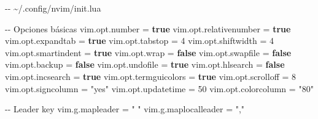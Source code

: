 \documentclass[
  doc,
  floatsintext,
  longtable,
  a4paper,
  nolmodern,
  notxfonts,
  notimes,
  12pt,
  colorlinks=true,linkcolor=blue,citecolor=blue,urlcolor=blue]{apa7}
\newenvironment{Shaded}{\begin{snugshade}}{\end{snugshade}}
\newcommand{\CommentTok}[1]{\textcolor[rgb]{0.37,0.37,0.37}{#1}}
\newcommand{\DecValTok}[1]{\textcolor[rgb]{0.68,0.00,0.00}{#1}}
\newcommand{\KeywordTok}[1]{\textcolor[rgb]{0.00,0.23,0.31}{\textbf{#1}}}
\newcommand{\OperatorTok}[1]{\textcolor[rgb]{0.37,0.37,0.37}{#1}}
\newcommand{\StringTok}[1]{\textcolor[rgb]{0.13,0.47,0.30}{#1}}
\newcommand{\VariableTok}[1]{\textcolor[rgb]{0.07,0.07,0.07}{#1}}
\begin{document}
\begin{Shaded}
\begin{Highlighting}[]
\CommentTok{{-}{-} \textasciitilde{}/.config/nvim/init.lua}

\CommentTok{{-}{-} Opciones básicas}
\VariableTok{vim}\OperatorTok{.}\VariableTok{opt}\OperatorTok{.}\VariableTok{number} \OperatorTok{=} \KeywordTok{true}
\VariableTok{vim}\OperatorTok{.}\VariableTok{opt}\OperatorTok{.}\VariableTok{relativenumber} \OperatorTok{=} \KeywordTok{true}
\VariableTok{vim}\OperatorTok{.}\VariableTok{opt}\OperatorTok{.}\VariableTok{expandtab} \OperatorTok{=} \KeywordTok{true}
\VariableTok{vim}\OperatorTok{.}\VariableTok{opt}\OperatorTok{.}\VariableTok{tabstop} \OperatorTok{=} \DecValTok{4}
\VariableTok{vim}\OperatorTok{.}\VariableTok{opt}\OperatorTok{.}\VariableTok{shiftwidth} \OperatorTok{=} \DecValTok{4}
\VariableTok{vim}\OperatorTok{.}\VariableTok{opt}\OperatorTok{.}\VariableTok{smartindent} \OperatorTok{=} \KeywordTok{true}
\VariableTok{vim}\OperatorTok{.}\VariableTok{opt}\OperatorTok{.}\VariableTok{wrap} \OperatorTok{=} \KeywordTok{false}
\VariableTok{vim}\OperatorTok{.}\VariableTok{opt}\OperatorTok{.}\VariableTok{swapfile} \OperatorTok{=} \KeywordTok{false}
\VariableTok{vim}\OperatorTok{.}\VariableTok{opt}\OperatorTok{.}\VariableTok{backup} \OperatorTok{=} \KeywordTok{false}
\VariableTok{vim}\OperatorTok{.}\VariableTok{opt}\OperatorTok{.}\VariableTok{undofile} \OperatorTok{=} \KeywordTok{true}
\VariableTok{vim}\OperatorTok{.}\VariableTok{opt}\OperatorTok{.}\VariableTok{hlsearch} \OperatorTok{=} \KeywordTok{false}
\VariableTok{vim}\OperatorTok{.}\VariableTok{opt}\OperatorTok{.}\VariableTok{incsearch} \OperatorTok{=} \KeywordTok{true}
\VariableTok{vim}\OperatorTok{.}\VariableTok{opt}\OperatorTok{.}\VariableTok{termguicolors} \OperatorTok{=} \KeywordTok{true}
\VariableTok{vim}\OperatorTok{.}\VariableTok{opt}\OperatorTok{.}\VariableTok{scrolloff} \OperatorTok{=} \DecValTok{8}
\VariableTok{vim}\OperatorTok{.}\VariableTok{opt}\OperatorTok{.}\VariableTok{signcolumn} \OperatorTok{=} \StringTok{"yes"}
\VariableTok{vim}\OperatorTok{.}\VariableTok{opt}\OperatorTok{.}\VariableTok{updatetime} \OperatorTok{=} \DecValTok{50}
\VariableTok{vim}\OperatorTok{.}\VariableTok{opt}\OperatorTok{.}\VariableTok{colorcolumn} \OperatorTok{=} \StringTok{"80"}

\CommentTok{{-}{-} Leader key}
\VariableTok{vim}\OperatorTok{.}\VariableTok{g}\OperatorTok{.}\VariableTok{mapleader} \OperatorTok{=} \StringTok{" "}
\VariableTok{vim}\OperatorTok{.}\VariableTok{g}\OperatorTok{.}\VariableTok{maplocalleader} \OperatorTok{=} \StringTok{","}


\end{Highlighting}
\end{Shaded}
\end{document}
